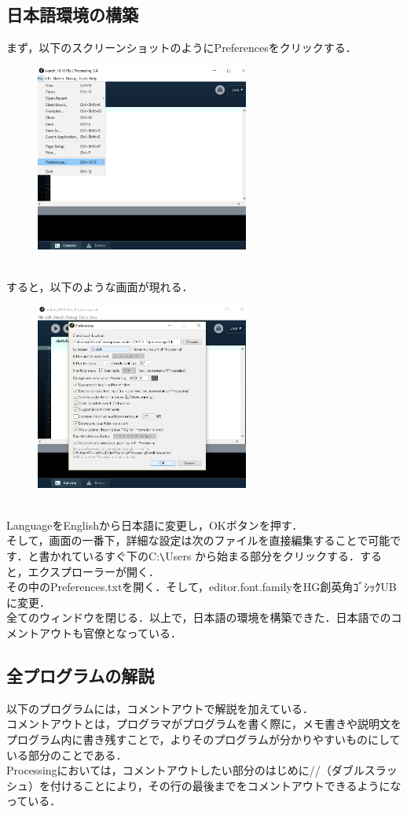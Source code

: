 \documentclass[a4j]{jarticle}
\begin{document}
\subsection{日本語環境の構築}
まず，以下のスクリーンショットのようにPreferencesをクリックする．\\
\begin{figure}[h]
\includegraphics[width=7cm]{t-3.png}
\end{figure}
\\
すると，以下のような画面が現れる．
\begin{figure}[h]
\includegraphics[width=7cm]{t-4.png}
\end{figure}
\\
LanguageをEnglishから日本語に変更し，OKボタンを押す．\\
そして，画面の一番下，詳細な設定は次のファイルを直接編集することで可能です．と書かれているすぐ下のC:\verb#\#Users から始まる部分をクリックする．すると，エクスプローラーが開く．\\
その中のPreferences.txtを開く．そして，editor.font.familyをHG創英角ｺﾞｼｯｸUBに変更．\\
全てのウィンドウを閉じる．以上で，日本語の環境を構築できた．日本語でのコメントアウトも官僚となっている．
\subsection{全プログラムの解説}
以下のプログラムには，コメントアウトで解説を加えている．\\
コメントアウトとは，プログラマがプログラムを書く際に，メモ書きや説明文をプログラム内に書き残すことで，よりそのプログラムが分かりやすいものにしている部分のことである．\\
Processingにおいては，コメントアウトしたい部分のはじめに//（ダブルスラッシュ）を付けることにより，その行の最後までをコメントアウトできるようになっている．\\
\end{document}
